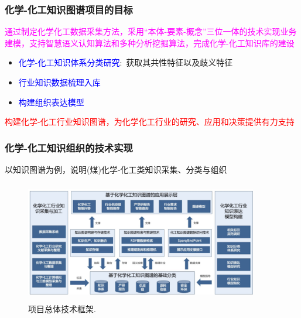 \frame
{
	\frametitle{化学-化工知识图谱项目的目标}
	\textcolor{magenta}{通过制定化学化工数据采集方法，采用``本体-要素-概念''三位一体的技术实现业务建模，支持智慧语义认知算法和多种分析挖掘算法，完成化学-化工知识库的建设} 
\begin{itemize}
	\item \textcolor{blue}{化学-化工知识体系分类研究}:~获取其共性特征以及歧义特征\\
		{\fontsize{7.2pt}{5.2pt}\selectfont{采用标签化、智能化建立知识库的方法，主要研究知识体系、产研报告、供应链信息、原料资料、安全质量、节能环保等细分语义分类，便于在知识图谱中进行建模训练}}

\item \textcolor{blue}{行业知识数据梳理入库}\\
	{\fontsize{7.2pt}{5.2pt}}

\item \textcolor{blue}{构建组织表达模型}\\
	{\fontsize{7.2pt}{5.2pt}\selectfont{采用数据提取、数据整合、知识融合、知识推理、质量评估、知识存储、图谱应用等建模流程节点方案，建立一套完善、可靠的化工化学全业务知识图谱系统方案}}
\end{itemize}
\textcolor{red}{构建化学-化工行业知识图谱，为化学化工行业的研究、应用和决策提供有力支持}
}
\begin{frame}
	\frametitle{化学-化工知识组织的技术实现}
	以知识图谱为例，说明(煤)化学-化工类知识采集、分类与组织
\begin{figure}[h!]
\centering
\includegraphics[height=2.08in,width=4.00in,viewport=0 0 245 113,clip]{Figures/KG_Chem-Frame.png}
\caption{\tiny 项目总体技术框架.}%
\label{KG_Chem-Frame}
\end{figure}
\end{frame}

